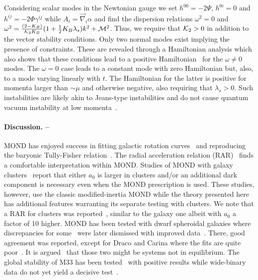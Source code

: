 \documentclass[twocolumn,prl,preprintnumbers,amsmath,amssymb,nofootinbib]{revtex4-2}
\newcommand{\mass}{\ensuremath{{\cal M}}}
\newcommand{\grad}{\ensuremath{\vec{\nabla}}}
\newcommand{\lambdas}{\lambda_s}
\newcommand{\Kcal}{{\cal K}}
\newcommand{\Ah}{{A}}
\newcommand{\KB}{\ensuremath{K_{B}}}
\begin{document}
Considering scalar modes in the Newtonian gauge we set $h^{00} = -2\Psi$, $h^{0i} = 0$ and  $h^{ij} = -2\Phi \gamma^{ij}$ while  $\Ah_i = \grad_i\alpha$
and find the dispersion relations $\omega^2=0$ and 
$\omega^2 = \frac{(2-\KB)}{\Kcal_2 \KB}  (1 + \frac{1}{2} \KB \lambdas) k^2 + \mass^2 $.
Thus, we require that  $\Kcal_2>0$ in addition to the vector stability conditions.
Only two normal modes exist implying the presence of constraints. 
These are revealed through  
a Hamiltonian analysis which also shows that these conditions lead to a positive Hamiltonian~\cite{SkordisZlosnikInPreparationMink,BatakiSkordisZlosnikInPreparation} 
for the $\omega\ne 0$ modes.
The $\omega=0$ case leads to a constant mode with zero Hamiltonian but, also, to a mode varying linearly with $t$. The Hamiltonian for the latter  is positive for momenta
larger than $\sim\mu$ and otherwise negative, also requiring that $\lambdas>0$.
Such instabilities are likely akin to Jeans-type instabilities and do not cause quantum vacuum instability at low momenta~\cite{GumrukcuogluMukohyamaSotiriou2016}.






\paragraph{Discussion. --}
MOND has enjoyed success in fitting galactic rotation curves~\cite{Milgrom1988,Kent1988,Begeman:1991iy,Sanders:1996ua,Sanders:2018mnk} and reproducing the baryonic Tully-Fisher relation~\cite{McGaugh:2000sr,McGaugh:2005qe,LelliEtAl2019}. 
The radial acceleration relation (RAR)~\cite{McGaughEtAl2016} finds a comfortable interpretation within MOND.
Studies of MOND with galaxy clusters~\cite{Sanders1999,Sanders:2002ue,Pointecouteau:2005mr,Famaey:2011kh,Ettori:2018tus,Tian:2020qjd} report that either $a_0$ is larger in clusters and/or an additional dark component is necessary even when the MOND prescription is used.
These studies, however, use the classic modified-inertia MOND while the theory presented here has additional features warranting its separate testing with clusters.
We note that a RAR for clusters was reported~\cite{Tian:2020qjd}, similar to the galaxy one  albeit with $a_0$ a factor of 10 higher. 
MOND has been tested with dwarf spheroidal galaxies where discrepancies for some~\cite{GerhardSpergel1992} were 
later dismissed with improved data~\cite{Milgrom:1995hz,Angus:2008vs,Serra:2009tj,Diez-Tejedor:2016fdn,AlexanderEtal2017}. There,
 good agreement was reported, except for Draco and Carina where the fits are quite poor~\cite{GerhardSpergel1992,Serra:2009tj,AlexanderEtal2017,Read:2018fxs}.
It is argued~\cite{Angus:2008vs} that those two might be systems not in equilibrium.
The global stability of M33 has been tested~\cite{Banik:2020kwt} with positive results while wide-binary data do not yet yield a decisive test~\cite{Pittordis:2019kxq}.
\end{document}

